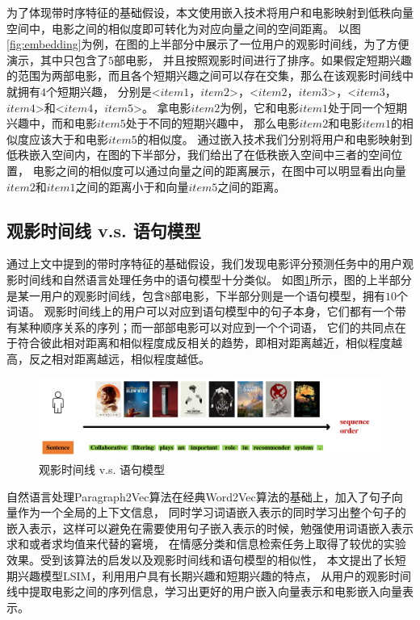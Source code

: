 为了体现带时序特征的基础假设，本文使用嵌入技术将用户和电影映射到低秩向量空间中，电影之间的相似度即可转化为对应向量之间的空间距离。
以图\ref{fig:embedding}为例，在图的上半部分中展示了一位用户的观影时间线，为了方便演示，其中只包含了$5$部电影，
并且按照观影时间进行了排序。如果假定短期兴趣的范围为两部电影，而且各个短期兴趣之间可以存在交集，那么在该观影时间线中就拥有$4$个短期兴趣，
分别是<$item1$，$item2$>，<$item2$，$item3$>，<$item3$，$item4$>和<$item4$，$item5$>。
拿电影$item2$为例，它和电影$item1$处于同一个短期兴趣中，而和电影$item5$处于不同的短期兴趣中，
那么电影$item2$和电影$item1$的相似度应该大于和电影$item5$的相似度。
通过嵌入技术我们分别将用户和电影映射到低秩嵌入空间内，在图的下半部分，我们给出了在低秩嵌入空间中三者的空间位置，
电影之间的相似度可以通过向量之间的距离展示，在图中可以明显看出向量$item2$和$item1$之间的距离小于和向量$item5$之间的距离。

\subsection{观影时间线 v.s. 语句模型}
通过上文中提到的带时序特征的基础假设，我们发现电影评分预测任务中的用户观影时间线和自然语言处理任务中的语句模型十分类似。
如图\ref{fig:example2}所示，图的上半部分是某一用户的观影时间线，包含$8$部电影，下半部分则是一个语句模型，拥有$10$个词语。
观影时间线上的用户可以对应到语句模型中的句子本身，它们都有一个带有某种顺序关系的序列；而一部部电影可以对应到一个个词语，
它们的共同点在于符合彼此相对距离和相似程度成反相关的趋势，即相对距离越近，相似程度越高，反之相对距离越远，相似程度越低。

\begin{figure}[htbp]
\centering
\includegraphics[scale=0.33]{images/example2.pdf}
\caption{观影时间线 v.s. 语句模型}
\label{fig:example2}
\end{figure}

自然语言处理Paragraph2Vec算法\parencite{le2014distributed}在经典Word2Vec算法的基础上，加入了句子向量作为一个全局的上下文信息，
同时学习词语嵌入表示的同时学习出整个句子的嵌入表示，这样可以避免在需要使用句子嵌入表示的时候，勉强使用词语嵌入表示求和或者求均值来代替的窘境，
在情感分类和信息检索任务上取得了较优的实验效果。受到该算法的启发以及观影时间线和语句模型的相似性，
本文提出了长短期兴趣模型LSIM，利用用户具有长期兴趣和短期兴趣的特点，
从用户的观影时间线中提取电影之间的序列信息，学习出更好的用户嵌入向量表示和电影嵌入向量表示。

